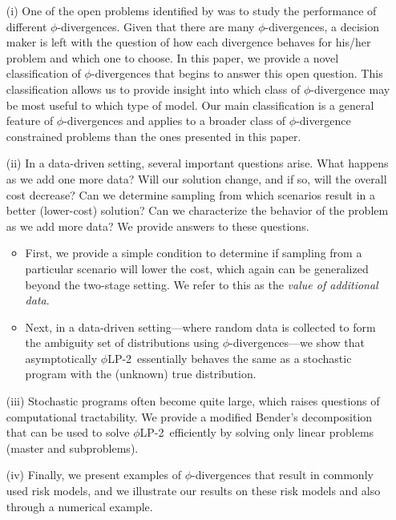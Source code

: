 \documentclass[opre,nonblindrev]{informs3} %
\newcommand{\plp}{$\phi$LP-2}
\begin{document}
\begin{itemize}
\item[(i)] One of the open problems identified by \citet{bental2011robust} was to study the performance of different $\phi$-divergences.
Given that there are many $\phi$-divergences, a decision maker is left with the question of how each divergence behaves for his/her problem and which one to choose.
In this paper, we provide a novel classification of $\phi$-divergences that begins to answer this open question.
This classification allows us to provide insight into which class of $\phi$-divergence may be most useful to which type of model.
		Our main classification is a general feature of $\phi$-divergences and applies to a broader class of $\phi$-divergence constrained problems than the ones presented in this paper. 

\item[(ii)] In a data-driven setting, several important questions arise.
		What happens as we add one more data?
		Will our solution change, and if so, will the overall cost decrease?
		Can we determine sampling from which scenarios result in a better (lower-cost) solution?
		Can we characterize the behavior of the problem as we add more data?
		We provide answers to these questions.

		\begin{itemize}
			\item First, we provide a simple condition to determine if sampling from a particular scenario will lower the cost, which again can be generalized beyond the two-stage setting.
		We refer to this as the {\it value of additional data}. 
			\item Next, in a data-driven setting---where random data is collected to form the ambiguity set of distributions using $\phi$-divergences---we show that asymptotically \plp\ essentially behaves  the same as a stochastic program with the (unknown) true distribution.
		\end{itemize}


\item[(iii)] Stochastic programs often become quite large, which raises questions of computational tractability.
		We provide a modified Bender's decomposition that can be used to solve \plp\ efficiently by solving only linear problems (master and subproblems). 

\item[(iv)]   Finally, we present examples of $\phi$-divergences that result in commonly used risk models, and we illustrate our results on these risk models and also through a numerical example. 
\end{itemize}
\end{document}
